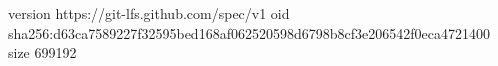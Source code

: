 version https://git-lfs.github.com/spec/v1
oid sha256:d63ca7589227f32595bed168af062520598d6798b8cf3e206542f0eca4721400
size 699192
